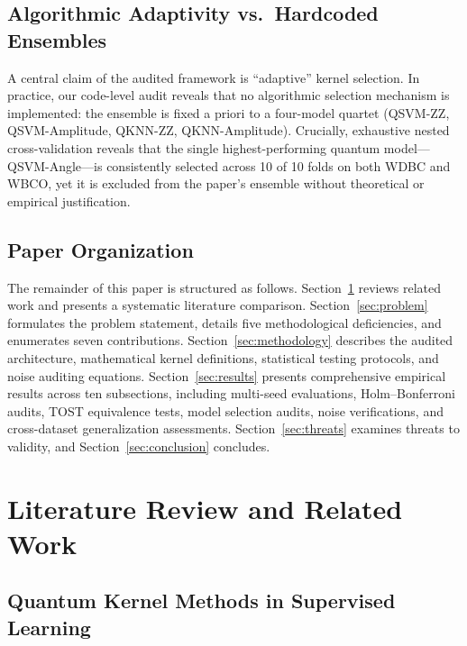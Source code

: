 \documentclass[journal,twocolumn]{IEEEtran}
\begin{document}
\subsection{Algorithmic Adaptivity vs.\ Hardcoded Ensembles}

A central claim of the audited framework is ``adaptive'' kernel selection. In practice, our code-level audit reveals that no algorithmic selection mechanism is implemented: the ensemble is fixed a priori to a four-model quartet (QSVM-ZZ, QSVM-Amplitude, QKNN-ZZ, QKNN-Amplitude). Crucially, exhaustive nested cross-validation reveals that the single highest-performing quantum model---QSVM-Angle---is consistently selected across 10 of 10 folds on both WDBC and WBCO, yet it is excluded from the paper's ensemble without theoretical or empirical justification.

\subsection{Paper Organization}

The remainder of this paper is structured as follows. Section~\ref{sec:litreview} reviews related work and presents a systematic literature comparison. Section~\ref{sec:problem} formulates the problem statement, details five methodological deficiencies, and enumerates seven contributions. Section~\ref{sec:methodology} describes the audited architecture, mathematical kernel definitions, statistical testing protocols, and noise auditing equations. Section~\ref{sec:results} presents comprehensive empirical results across ten subsections, including multi-seed evaluations, Holm--Bonferroni audits, TOST equivalence tests, model selection audits, noise verifications, and cross-dataset generalization assessments. Section~\ref{sec:threats} examines threats to validity, and Section~\ref{sec:conclusion} concludes.

\section{Literature Review and Related Work}
\label{sec:litreview}

\subsection{Quantum Kernel Methods in Supervised Learning}
\end{document}
